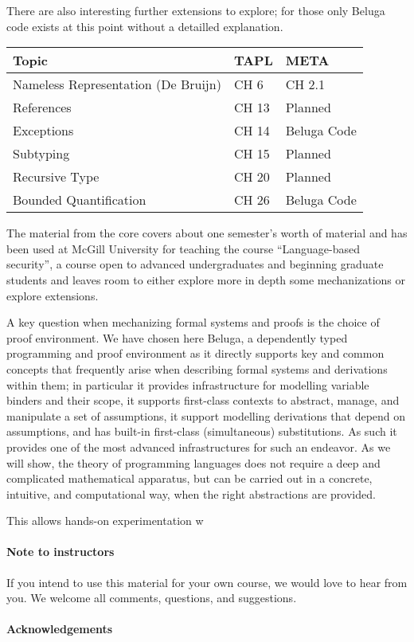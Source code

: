 There are also interesting further extensions to explore; for those only Beluga code exists at this point without a detailled explanation. 

\begin{center}
\begin{tabular}{p{9cm}|p{2.5cm}|p{3cm}}
 Topic & TAPL & META \\
\hline    
Nameless Representation (De Bruijn) & CH 6 & CH 2.1 \\  
References & CH 13 & Planned \\
Exceptions & CH 14 & Beluga Code \\
Subtyping & CH 15 & Planned \\
Recursive Type & CH 20 & Planned\\
Bounded Quantification & CH 26 & Beluga Code \\
\end{tabular}
\end{center}


The material from the core covers about one semester's worth of material and has been used at McGill University for teaching the course ``Language-based security'', a course open to advanced undergraduates and beginning graduate students and leaves room to either explore more in depth some mechanizations or explore extensions.

A key question when mechanizing formal systems and proofs is the choice of proof environment.  We have chosen here Beluga, a dependently typed programming and proof environment as it directly supports key and common concepts that frequently arise when describing formal systems and derivations within them; in particular it provides infrastructure for modelling variable binders and their scope, it supports first-class contexts to abstract, manage, and manipulate a set of assumptions, it support modelling derivations that depend on assumptions, and has built-in first-class (simultaneous) substitutions.  As such it provides one of the most advanced infrastructures for such an endeavor. As we will show,  the theory of programming languages does
not require a deep and complicated mathematical apparatus, but can be carried out in a concrete, intuitive, and computational way, when the right abstractions are provided. 

This allows hands-on experimentation w


\paragraph{Note to instructors}
If you intend to use this material for your own course, we would love to hear from you. We welcome all comments, questions, and suggestions.

\paragraph{Acknowledgements}

